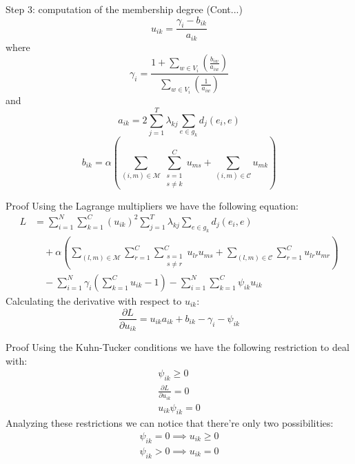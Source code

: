 \documentclass{beamer}
\begin{document}
\begin{frame}{Step 3: computation of the membership degree (Cont...)}
\begin{equation*}
\label{membership-equation}
u_{ik} =\frac{\gamma_{i} - b_{ik}}{a_{ik}}
\end{equation*}
where
\begin{equation*}
\label{gamma-equation}
\gamma_{i}=\frac{1+\sum_{w \in {V_{i}}}(\frac{b_{iw}}{a_{iw}})}{\sum_{w \in {V_{i}}}(\frac{1}{a_{iw}})}
\end{equation*}
and
\begin{displaymath}
a_{ik}=2\sum_{j=1}^{T}\lambda_{kj}\sum_{e \in g_{k}}d_{j}(e_{i},e)
\end{displaymath}
\begin{displaymath}
b_{ik}=\alpha\left(\sum_{(i,m)\in\mathcal{M}}\sum_{\substack{s=1\\{s}\neq{k}}}^{C}u_{ms}+\sum_{(i,m)\in\mathcal{C}}u_{mk}\right)
\end{displaymath}
\end{frame}

\begin{frame}{Proof}
Using the Lagrange multipliers we have the following equation:
\begin{equation*}
\begin{split}
L&
=
\sum_{i=1}^{N}
\sum_{k=1}^{C}(u_{ik})^{2}
\sum_{j=1}^{T}\lambda_{kj}
\sum_{{e}\in{g_{k}}}d_{j}(e_{i},e) \\
& \quad +
\alpha
\left (
\sum_{(l,m)\in\mathcal{M}}
\sum_{r=1}^{C}
\sum_{
\substack{
s=1 \\ {s}\neq{r}
}
}^{C}u_{lr}u_{ms}
+
\sum_{(l,m)\in\mathcal{C}}
\sum_{r=1}^{C}u_{lr}u_{mr}
\right ) \\
& \quad -
\sum_{i=1}^{N}\gamma_{i}
\left (
\sum_{k=1}^{C}u_{ik}-1
\right )
-
\sum_{i=1}^{N}
\sum_{k=1}^{C}\psi_{ik}u_{ik}
\end{split}
\end{equation*}
Calculating the derivative with respect to $u_{ik}$:
\begin{equation}
\frac{\partial{L}}{\partial{u_{ik}}}
=
u_{ik}a_{ik}
+
b_{ik}
-
\gamma_{i}
-
\psi_{ik}
\end{equation}
\end{frame}

\begin{frame}{Proof}
Using the Kuhn-Tucker conditions we have the following restriction to deal with:
\begin{gather}
\psi_{ik} \geq 0 \\
\frac{\partial{L}}{\partial{u_{ik}}} = 0 \\
u_{ik} \psi_{ik} = 0
\end{gather}
Analyzing these restrictions we can notice that there're only two possibilities:
\begin{gather}
\psi_{ik} = 0 \implies  u_{ik} \geq 0 \\
\psi_{ik} > 0 \implies  u_{ik} = 0
\end{gather}
\end{frame}
\end{document}
